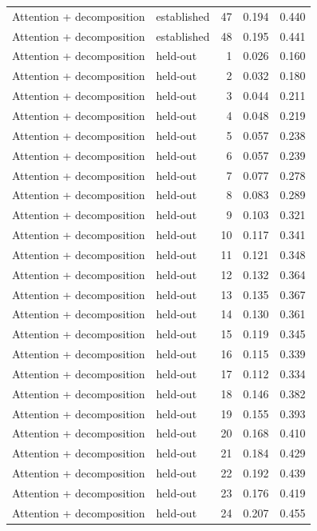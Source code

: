 \begin{tabular}{llrrr}
Attention + decomposition & established & 47 & 0.194 & 0.440 \\
Attention + decomposition & established & 48 & 0.195 & 0.441 \\
Attention + decomposition & held-out & 1 & 0.026 & 0.160 \\
Attention + decomposition & held-out & 2 & 0.032 & 0.180 \\
Attention + decomposition & held-out & 3 & 0.044 & 0.211 \\
Attention + decomposition & held-out & 4 & 0.048 & 0.219 \\
Attention + decomposition & held-out & 5 & 0.057 & 0.238 \\
Attention + decomposition & held-out & 6 & 0.057 & 0.239 \\
Attention + decomposition & held-out & 7 & 0.077 & 0.278 \\
Attention + decomposition & held-out & 8 & 0.083 & 0.289 \\
Attention + decomposition & held-out & 9 & 0.103 & 0.321 \\
Attention + decomposition & held-out & 10 & 0.117 & 0.341 \\
Attention + decomposition & held-out & 11 & 0.121 & 0.348 \\
Attention + decomposition & held-out & 12 & 0.132 & 0.364 \\
Attention + decomposition & held-out & 13 & 0.135 & 0.367 \\
Attention + decomposition & held-out & 14 & 0.130 & 0.361 \\
Attention + decomposition & held-out & 15 & 0.119 & 0.345 \\
Attention + decomposition & held-out & 16 & 0.115 & 0.339 \\
Attention + decomposition & held-out & 17 & 0.112 & 0.334 \\
Attention + decomposition & held-out & 18 & 0.146 & 0.382 \\
Attention + decomposition & held-out & 19 & 0.155 & 0.393 \\
Attention + decomposition & held-out & 20 & 0.168 & 0.410 \\
Attention + decomposition & held-out & 21 & 0.184 & 0.429 \\
Attention + decomposition & held-out & 22 & 0.192 & 0.439 \\
Attention + decomposition & held-out & 23 & 0.176 & 0.419 \\
Attention + decomposition & held-out & 24 & 0.207 & 0.455 \\

\end{tabular}
